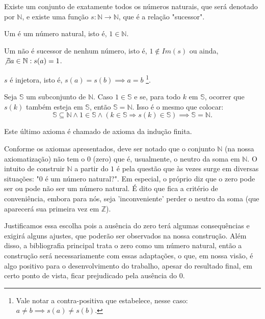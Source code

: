 \documentclass[../main.tex]{subfiles}
\begin{document}
\begin{axi}\label{nat-axi-existeConjuntoNeFuncaoS}
    Existe um conjunto de exatamente todos os números naturais, que será denotado por $\mathbb{N}$, e existe uma função $s: \mathbb{N} \rightarrow \mathbb{N}$, que é a relação "sucessor". 
\end{axi}
\begin{axi}\label{nat-axi-umNatural}
    Um é um número natural, isto é, $1 \in \mathbb{N}$.
\end{axi}
\begin{axi}\label{nat-axi-umNaoSucessor}
    Um não é sucessor de nenhum número, isto é, $1 \not \in Im(s)$ ou ainda, $\not \exists a \in \mathbb{N} : s(a) = 1$.
\end{axi}
\begin{axi}\label{nat-axi-SInjetora}
    $s$ é injetora, isto é, $s(a) = s(b) \implies a = b$ \footnote{Vale notar a contra-positiva que estabelece, nesse caso: $a \neq b \implies s(a) \neq s(b)$.}.
\end{axi}
\begin{axi}\label{nat-axi-inducaoFinita}
    Seja $\mathbb{S}$ um subconjunto de $\mathbb{N}$. Caso $1 \in \mathbb{S}$ e se, para todo $k$ em $\mathbb{S}$, ocorrer que $s(k)$ também esteja em $\mathbb{S}$, então $\mathbb{S} = \mathbb{N}$. Isso é o mesmo que colocar: \\
     \[ \mathbb{S} \subseteq \mathbb{N} \land 1 \in \mathbb{S} \land ( k \in \mathbb{S} \Rightarrow s(k) \in \mathbb{S}) \implies \mathbb{S} = \mathbb{N} .\]
\end{axi}
Este último axioma é chamado de axioma da indução finita.

Conforme os axiomas apresentados, deve ser notado que o conjunto $\mathbb{N}$ (na nossa axiomatização) não tem o $0$ (zero) que é, usualmente, o neutro da soma em $\mathbb{N}$. O intuito de construir $\mathbb{N}$ a partir do $1$ é pela questão que às vezes surge em diversas situações: "$0$ é um número natural?". Em especial, o próprio \textcite{lima-site} diz que o zero pode ser ou pode não ser um número natural. É dito que fica a critério de conveniência, embora para nós, seja 'inconveniente' perder o neutro da soma (que aparecerá sua primeira vez em $\mathbb{Z}$). 

Justificamos essa escolha pois a ausência do zero terá algumas consequências e exigirá alguns ajustes, que poderão ser observados na nossa construção. Além disso, a bibliografia principal trata o zero como um número natural, então a construção será necessariamente com essas adaptações, o que, em nossa visão, é algo positivo para o desenvolvimento do trabalho, apesar do resultado final, em certo ponto de vista, ficar prejudicado pela ausência do $0$.
\end{document}
